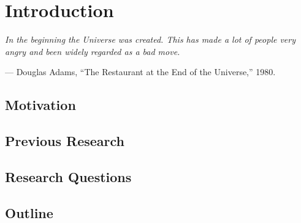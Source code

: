 \chapter{Introduction}
\epigraph{ \it
    In the beginning the Universe was created.
    This has made a lot of people very angry and been widely regarded as a bad move.
}{--- Douglas Adams, ``The Restaurant at the End of the Universe,'' 1980.}

\section{Motivation}

\section{Previous Research}

\section{Research Questions}

\section{Outline}

